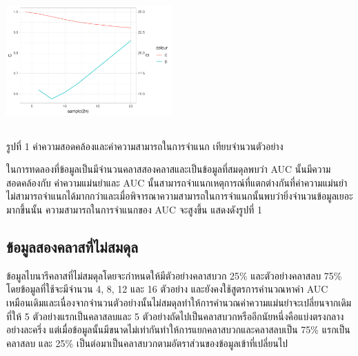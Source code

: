 \documentclass[twoside, twocolumn, 12pt]{article}
\begin{document}
\begin{center}\includegraphics[height=2in,width=2.5in]{pic/Rplot01} \end{center}
\begin{center} รูปที่ 1 ค่าความสอดคล้องและค่าความสามารถในการจำแนก เทียบจำนวนตัวอย่าง \end{center}

ในการทดลองที่ข้อมูลเป็นมีจำนวนคลาสสองคลาสและเป็นข้อมูลที่สมดุลพบว่า AUC นั้นมีความสอดคล้องกับ ค่าความแม่นยำและ AUC นั้นสามารถจำแนกเหตุการณ์ที่แตกต่างกันที่ค่าความแม่นยำไม่สามารถจำแนกได้มากกว่าและเมื่อพิจารณาความสามารถในการจำแนกนั้นพบว่ายิ่งจำนวนข้อมูลเยอะมากขึ้นนั้น ความสามารถในการจำแนกของ AUC จะสูงขึ้น แสดงดังรูปที่ 1
\subsection{ข้อมูลสองคลาสที่ไม่สมดุล}
\quad ข้อมูลไบนารีคลาสที่ไม่สมดุลโดยจะกำหนดให้มีตัวอย่างคลาสบวก 25\% และตัวอย่างคลาสลบ 75\% โดยข้อมูลที่ใช้จะมีจำนวน 4, 8, 12 และ 16 ตัวอย่าง และยังคงใช้สูตรการคำนวณหาค่า AUC เหมือนเดิมและเนื่องจากจำนวนตัวอย่างนั้นไม่สมดุลทำให้การคำนวณค่าความแม่นยำจะเปลี่ยนจากเดิมที่ให้ 5 ตัวอย่างแรกเป็นคลาสลบและ 5 ตัวอย่างถัดไปเป็นคลาสบวกหรืออีกนัยหนึ่งคือแบ่งตรงกลางอย่างละครึ่ง แต่เมื่อข้อมูลนั้นมีขนาดไม่เท่ากันทำให้การแยกคลาสบวกและคลาสลบเป็น 75\% แรกเป็นคลาสลบ และ 25\% เป็นต่อมาเป็นคลาสบวกตามอัตราส่วนของข้อมูลเข้าที่เปลี่ยนไป
\end{document}
